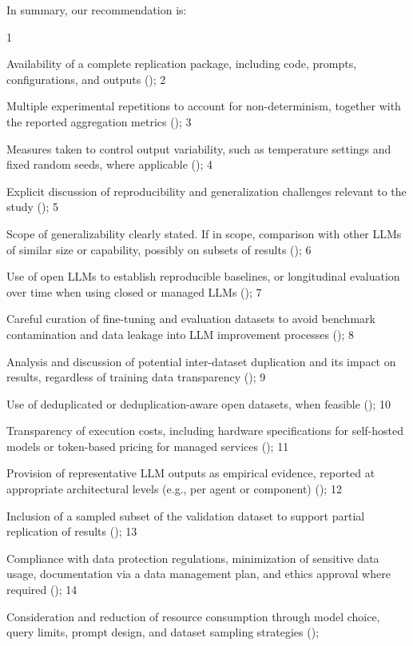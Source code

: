 In summary, our recommendation is:

\begin{enumerate*}[label=(\arabic*)]
1\item Availability of a complete replication package, including code, prompts, configurations, and outputs (\must);
2\item Multiple experimental repetitions to account for non-determinism, together with the reported aggregation metrics (\should);
3\item Measures taken to control output variability, such as temperature settings and fixed random seeds, where applicable (\may);
4\item Explicit discussion of reproducibility and generalization challenges relevant to the study (\must);
5\item Scope of generalizability clearly stated. If in scope, comparison with other LLMs of similar size or capability, possibly on subsets of results (\must);
6\item Use of open LLMs to establish reproducible baselines, or longitudinal evaluation over time when using closed or managed LLMs (\should);
7\item Careful curation of fine-tuning and evaluation datasets to avoid benchmark contamination and data leakage into LLM improvement processes (\must);
8\item Analysis and discussion of potential inter-dataset duplication and its impact on results, regardless of training data transparency (\must);
9\item Use of deduplicated or deduplication-aware open datasets, when feasible (\may);
10\item Transparency of execution costs, including hardware specifications for self-hosted models or token-based pricing for managed services (\should);
11\item Provision of representative LLM outputs as empirical evidence, reported at appropriate architectural levels (e.g., per agent or component) (\must);
12\item Inclusion of a sampled subset of the validation dataset to support partial replication of results (\should);
13\item Compliance with data protection regulations, minimization of sensitive data usage, documentation via a data management plan, and ethics approval where required (\must);
14\item Consideration and reduction of resource consumption through model choice, query limits, prompt design, and dataset sampling strategies (\should);

\end{enumerate*}
